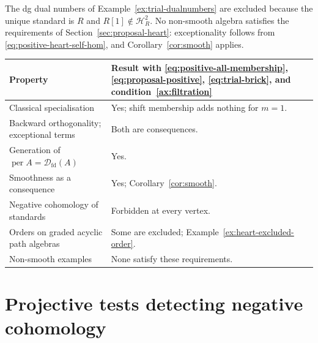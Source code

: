 \documentclass[11pt,a4paper]{article}
\newcommand{\D}{\mathcal D}
\renewcommand{\H}{\mathcal H}
\DeclareMathOperator{\fd}{fd}
\DeclareMathOperator{\per}{per}
\theoremstyle{plain}
\theoremstyle{definition}
\numberwithin{equation}{section}
\begin{document}
The dg dual numbers of Example~\ref{ex:trial-dualnumbers} are
excluded because the unique standard is $R$ and
$R[1]\notin\H_R^2$. No non-smooth algebra satisfies the requirements
of Section~\ref{sec:proposal-heart}: exceptionality follows from
\eqref{eq:positive-heart-self-hom}, and Corollary~\ref{cor:smooth}
applies.

\begin{center}\small
\begin{tabularx}{\linewidth}{@{}>{\raggedright\arraybackslash}p{.36\linewidth}>{\raggedright\arraybackslash}X@{}}
\toprule
Property & Result with \eqref{eq:positive-all-membership},
\eqref{eq:proposal-positive}, \eqref{eq:trial-brick}, and condition~\ref{ax:filtration}\\
\midrule
Classical specialisation & Yes; shift membership adds nothing for $m=1$.\\
Backward orthogonality; exceptional terms & Both are consequences.\\
Generation of $\per A=\D_{\fd}(A)$ & Yes.\\
Smoothness as a consequence & Yes; Corollary~\ref{cor:smooth}.\\
Negative cohomology of standards & Forbidden at every vertex.\\
Orders on graded acyclic path algebras & Some are excluded;
Example~\ref{ex:heart-excluded-order}.\\
Non-smooth examples & None satisfy these requirements.\\
\bottomrule
\end{tabularx}
\end{center}

\section{Projective tests detecting negative cohomology}
\label{sec:proposal-negative}
\end{document}
